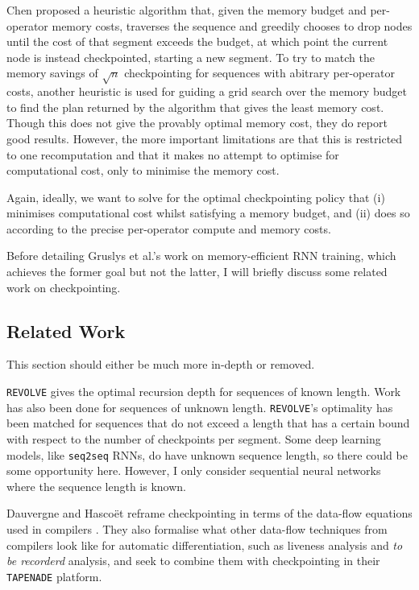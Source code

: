 Chen proposed a heuristic algorithm that, given the memory budget and per-operator memory costs, traverses the sequence and greedily chooses to drop nodes until the cost of that segment exceeds the budget, at which point the current node is instead checkpointed, starting a new segment.
To try to match the memory savings of \(\sqrt{n}\) checkpointing for sequences with abitrary per-operator costs, another heuristic is used for guiding a grid search over the memory budget to find the plan returned by the algorithm that gives the least memory cost.
Though this does not give the provably optimal memory cost, they do report good results.
However, the more important limitations are that this is restricted to one recomputation and that it makes no attempt to optimise for computational cost, only to minimise the memory cost.

Again, ideally, we want to solve for the optimal checkpointing policy that (i) minimises computational cost whilst satisfying a memory budget, and (ii) does so according to the precise per-operator compute and memory costs. 

Before detailing Gruslys et al.'s \cite{Gruslys2016} work on memory-efficient RNN training, which achieves the former goal but not the latter, I will briefly discuss some related work on checkpointing.

\subsection{Related Work}
 This section should either be much more in-depth or removed.

\texttt{REVOLVE} gives the optimal recursion depth for sequences of known length.
Work has also been done for sequences of unknown length.
\texttt{REVOLVE}'s optimality has been matched for sequences that do not exceed a length that has a certain bound with respect to the number of checkpoints per segment.
Some deep learning models, like \texttt{seq2seq} RNNs, do have unknown sequence length, so there could be some opportunity here.
However, I only consider sequential neural networks where the sequence length is known.

Dauvergne and Hasco\"{e}t reframe checkpointing in terms of the data-flow equations used in compilers \cite{Dauvergne2006}.
They also formalise what other data-flow techniques from compilers look like for automatic differentiation, such as liveness analysis and \textit{to be recorderd} analysis, and seek to combine them with checkpointing in their \texttt{TAPENADE} platform.


